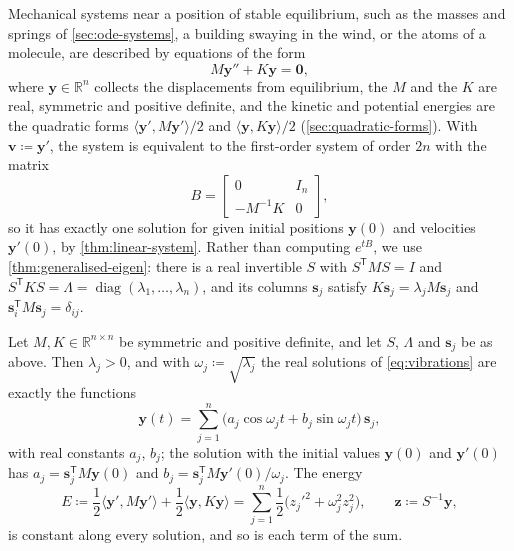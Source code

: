 Mechanical systems near a position of stable equilibrium, such as the masses and springs of \cref{sec:ode-systems}, a building swaying in the wind, or the atoms of a molecule, are described by equations of the form
\begin{equation}
M\mathbf y''+K\mathbf y=\mathbf 0 ,
\label{eq:vibrations}
\end{equation}
where $\mathbf y\in\mathbb R^n$ collects the displacements from equilibrium, the  $M$ and the  $K$ are real, symmetric and positive definite, and the kinetic and potential energies are the quadratic forms $\langle\mathbf y',M\mathbf y'\rangle/2$ and $\langle\mathbf y,K\mathbf y\rangle/2$ (\cref{sec:quadratic-forms}). With $\mathbf v\coloneqq\mathbf y'$, the system is equivalent to the first-order system of order $2n$ with the matrix
\[
B=\begin{bmatrix}0&I_n\\-M^{-1}K&0\end{bmatrix},
\]
so it has exactly one solution for given initial positions $\mathbf y(0)$ and velocities $\mathbf y'(0)$, by \cref{thm:linear-system}. Rather than computing $e^{tB}$, we use \cref{thm:generalised-eigen}: there is a real invertible $S$ with $S^{\mathsf T}MS=I$ and $S^{\mathsf T}KS=\Lambda=\operatorname{diag}(\lambda_1,\ldots,\lambda_n)$, and its columns $\mathbf s_j$ satisfy $K\mathbf s_j=\lambda_jM\mathbf s_j$ and $\mathbf s_i^{\mathsf T}M\mathbf s_j=\delta_{ij}$.

\begin{theorem}
\label{thm:normal-modes}
Let $M,K\in\mathbb R^{n\times n}$ be symmetric and positive definite, and let $S$, $\Lambda$ and $\mathbf s_j$ be as above. Then $\lambda_j>0$, and with $\omega_j\coloneqq\sqrt{\lambda_j}$ the real solutions of \eqref{eq:vibrations} are exactly the functions
\begin{equation}
\mathbf y(t)=\sum_{j=1}^n\bigl(a_j\cos\omega_jt+b_j\sin\omega_jt\bigr)\,\mathbf s_j ,
\label{eq:mode-expansion}
\end{equation}
with real constants $a_j$, $b_j$; the solution with the initial values $\mathbf y(0)$ and $\mathbf y'(0)$ has $a_j=\mathbf s_j^{\mathsf T}M\mathbf y(0)$ and $b_j=\mathbf s_j^{\mathsf T}M\mathbf y'(0)/\omega_j$. The energy
\[
E\coloneqq\frac12\langle\mathbf y',M\mathbf y'\rangle+\frac12\langle\mathbf y,K\mathbf y\rangle=\sum_{j=1}^n\frac12\bigl(z_j'^2+\omega_j^2z_j^2\bigr),\qquad\mathbf z\coloneqq S^{-1}\mathbf y ,
\]
is constant along every solution, and so is each term of the sum.
\end{theorem}

